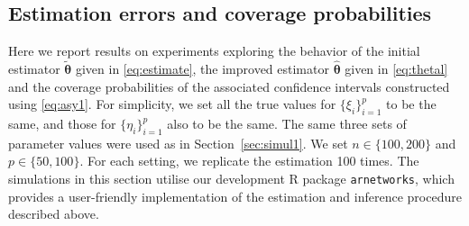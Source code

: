 \documentclass[12pt]{article}
\newcommand{\btheta}{\boldsymbol \theta}
\newcommand{\0}{{\bf 0}}
\begin{document}
\subsection{Estimation errors and coverage probabilities}
\label{sec:sim.est}
Here we report results on experiments exploring the behavior of the
initial estimator $\tilde{\btheta}$ given in \eqref{eq:estimate}, the improved estimator $\hat{\btheta}$ given in \eqref{eq:thetal}  and the coverage probabilities of the associated confidence intervals constructed using \eqref{eq:asy1}.  For simplicity, we  set all the true values for  $\{\xi_i\}_{i=1}^p$ to be the same, and those for $\{\eta_i\}_{i=1}^p$ also to be the same. The same three sets of parameter values were used as in Section~\ref{sec:simul1}.
We set $n\in\{100, 200\}$ and $p\in\{ 50, 100\}$.
For each setting, we replicate the estimation 100 times. The simulations in this section utilise our development R package \texttt{arnetworks}, which provides a user-friendly implementation of the estimation and inference procedure described above. 
\end{document}
